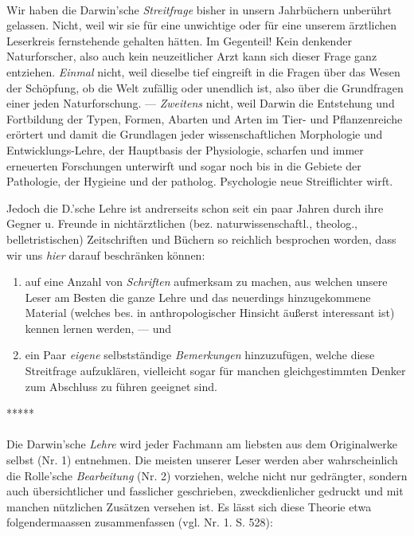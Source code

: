 \documentclass[a4paper, 11pt, oneside, english]{article}
\begin{document}
\paragraph{}
Wir haben die Darwin'sche \emph{Streitfrage} bisher in unsern Jahrbüchern unberührt gelassen. Nicht, weil wir sie für eine unwichtige oder für eine unserem ärztlichen Leserkreis fernstehende gehalten hätten. Im Gegenteil! Kein denkender Naturforscher, also auch kein neuzeitlicher Arzt kann sich dieser Frage ganz entziehen. \emph{Einmal} nicht, weil dieselbe tief eingreift in die Fragen über das Wesen der Schöpfung, ob die Welt zufällig oder unendlich ist, also über die Grundfragen einer jeden Naturforschung. --- \emph{Zweitens} nicht, weil Darwin die Entstehung und Fortbildung der Typen, Formen, Abarten und Arten im Tier- und Pflanzenreiche erörtert und damit die Grundlagen jeder wissenschaftlichen Morphologie und Entwicklungs-Lehre, der Hauptbasis der Physiologie, scharfen und immer erneuerten Forschungen unterwirft und sogar noch bis in die Gebiete der Pathologie, der Hygieine und der patholog. Psychologie neue Streiflichter wirft.

Jedoch die D.'sche Lehre ist andrerseits schon seit ein paar Jahren durch ihre Gegner u. Freunde in nichtärztlichen (bez. naturwissenschaftl., theolog., belletristischen) Zeitschriften und Büchern so reichlich besprochen worden, dass wir uns \emph{hier} darauf beschränken können:
\begin{enumerate}
    \item auf eine Anzahl von \emph{Schriften} aufmerksam zu machen, aus welchen unsere Leser am Besten die ganze Lehre und das neuerdings hinzugekommene Material (welches bes. in anthropologischer Hinsicht äußerst interessant ist) kennen lernen werden, --- und

    \item ein Paar \emph{eigene} selbstständige \emph{Bemerkungen} hinzuzufügen, welche diese Streitfrage aufzuklären, vielleicht sogar für manchen gleichgestimmten Denker zum Abschluss zu führen geeignet sind.
\end{enumerate}

\centerline{*\hspace{15mm}*\hspace{15mm}*\hspace{15mm}*\hspace{15mm}*}
\bigskip

\paragraph{}
Die Darwin'sche \emph{Lehre} wird jeder Fachmann am liebsten aus dem Originalwerke selbst (Nr. 1) entnehmen. Die meisten unserer Leser werden aber wahrscheinlich die Rolle'sche \emph{Bearbeitung} (Nr. 2) vorziehen, welche nicht nur gedrängter, sondern auch übersichtlicher und fasslicher geschrieben, zweckdienlicher gedruckt und mit manchen nützlichen Zusätzen versehen ist. Es lässt sich diese Theorie etwa folgendermaassen zusammenfassen (vgl. Nr. 1. S. 528):
\end{document}
